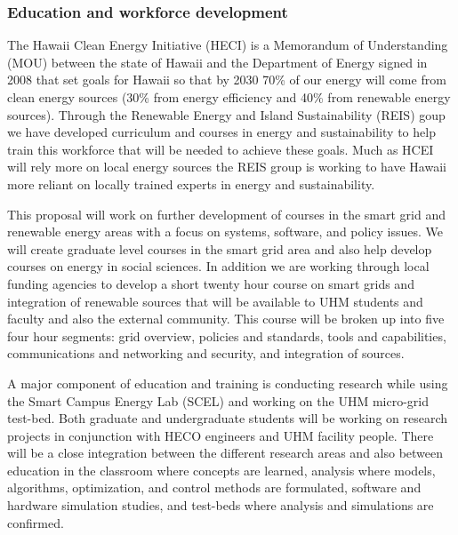
\subsubsection{Education and workforce development}
  
The Hawaii Clean Energy Initiative (HECI) is a Memorandum of 
Understanding (MOU) between the state of  Hawaii and
the Department of Energy signed in 2008 that set goals for Hawaii so that by 2030
70\% of our energy will come from clean energy sources
(30\% from energy efficiency and 40\% from renewable energy sources).   
Through  the Renewable Energy and Island Sustainability (REIS) goup  we have developed 
curriculum and courses in energy and sustainability to help train this workforce that will be
needed to achieve these goals.  Much as HCEI will rely more on local energy sources the
REIS group is working to have Hawaii more reliant on locally trained experts in energy and
sustainability.
  
This proposal will work on further development of courses in the smart grid and renewable energy
areas with a focus on systems, software, and policy issues.   We will create graduate level courses in
the smart grid area and also help develop courses on energy in social sciences.  In addition we
are working through local funding agencies to develop a short twenty hour course on smart grids
and integration of renewable sources that will be available to UHM students and faculty and also
the external community.  This course will be broken up into five four hour segments: grid
overview,  policies and standards, tools and capabilities, communications and networking and
security, and integration of sources.

A major component of education and training is conducting research while using the Smart
Campus Energy Lab (SCEL) and working on the UHM micro-grid test-bed.  Both graduate and
undergraduate students will be working on research projects in conjunction with HECO engineers
and UHM facility people.  There will be a close integration between the different research
areas and also between education in the classroom where concepts are learned, analysis where
models, algorithms, optimization, and control methods are formulated,  software and hardware
simulation studies, and test-beds where  analysis and simulations are confirmed.

